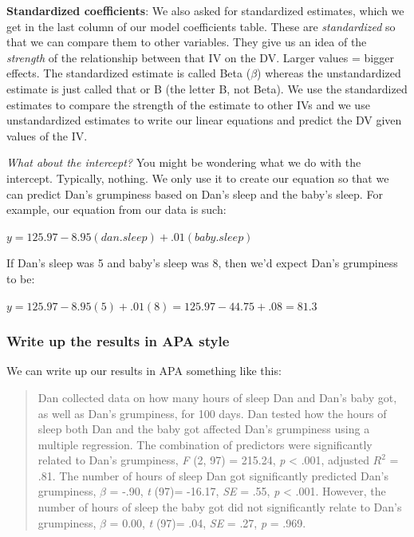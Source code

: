 \documentclass[
]{book}
\begin{document}
\textbf{Standardized coefficients}: We also asked for standardized estimates, which we get in the last column of our model coefficients table. These are \emph{standardized} so that we can compare them to other variables. They give us an idea of the \emph{strength} of the relationship between that IV on the DV. Larger values = bigger effects. The standardized estimate is called Beta (\(\beta\)) whereas the unstandardized estimate is just called that or B (the letter B, not Beta). We use the standardized estimates to compare the strength of the estimate to other IVs and we use unstandardized estimates to write our linear equations and predict the DV given values of the IV.

\emph{What about the intercept?} You might be wondering what we do with the intercept. Typically, nothing. We only use it to create our equation so that we can predict Dan's grumpiness based on Dan's sleep and the baby's sleep. For example, our equation from our data is such:

\(y = 125.97 - 8.95(dan.sleep) + .01(baby.sleep)\)

If Dan's sleep was 5 and baby's sleep was 8, then we'd expect Dan's grumpiness to be:

\(y = 125.97 - 8.95(5) + .01(8) = 125.97 - 44.75 + .08 = 81.3\)

\hypertarget{write-up-the-results-in-apa-style-9}{%
\subsubsection{Write up the results in APA style}\label{write-up-the-results-in-apa-style-9}}

We can write up our results in APA something like this:

\begin{quote}
Dan collected data on how many hours of sleep Dan and Dan's baby got, as well as Dan's grumpiness, for 100 days. Dan tested how the hours of sleep both Dan and the baby got affected Dan's grumpiness using a multiple regression. The combination of predictors were significantly related to Dan's grumpiness, \emph{F} (2, 97) = 215.24, \emph{p} \textless{} .001, adjusted \(R^2\) = .81. The number of hours of sleep Dan got significantly predicted Dan's grumpiness, \(\beta\) = -.90, \emph{t} (97)= -16.17, \emph{SE} = .55, \emph{p} \textless{} .001. However, the number of hours of sleep the baby got did not significantly relate to Dan's grumpiness, \(\beta\) = 0.00, \emph{t} (97)= .04, \emph{SE} = .27, \emph{p} = .969.
\end{quote}
\end{document}
